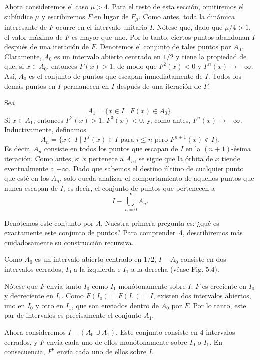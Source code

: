 \documentclass[10pt,a4paper]{book}
\begin{document}
\medskip

Ahora consideremos el caso $\mu>4$. Para el resto de esta sección, omitiremos el subíndice $\mu$ y escribiremos $F$ en lugar de $F_{\mu}$. Como antes, toda la dinámica interesante de $F$ ocurre en el intervalo unitario $I$. Nótese que, dado que $\mu/4>1$, el valor máximo de $F$ es mayor que uno. Por lo tanto, ciertos puntos abandonan $I$ después de una iteración de $F$. Denotemos el conjunto de tales puntos por $A_{0}$. Claramente, $A_{0}$ es un intervalo abierto centrado en $1/2$ y tiene la propiedad de que, si $x\in A_{0}$, entonces $F(x)>1$, de modo que $F^{2}(x)<0$ y $F^{n}(x)\to -\infty$. Así, $A_{0}$ es el conjunto de puntos que escapan inmediatamente de $I$. Todos los demás puntos en $I$ permanecen en $I$ después de una iteración de $F$.

\medskip

Sea
\[
A_{1} = \{x \in I \mid F(x)\in A_{0}\}.
\]
Si $x\in A_{1}$, entonces $F^{2}(x)>1$, $F^{3}(x)<0$, y, como antes, $F^{n}(x)\to -\infty$. Inductivamente, definamos
\[
A_{n}=\{x\in I \mid F^{i}(x)\in I \text{ para } i\leq n \text{ pero } F^{n+1}(x)\notin I\}.
\]
Es decir, $A_{n}$ consiste en todos los puntos que escapan de $I$ en la $(n+1)$-ésima iteración. Como antes, si $x$ pertenece a $A_{n}$, se sigue que la órbita de $x$ tiende eventualmente a $-\infty$. Dado que sabemos el destino último de cualquier punto que esté en los $A_{n}$, solo queda analizar el comportamiento de aquellos puntos que nunca escapan de $I$, es decir, el conjunto de puntos que pertenecen a
\[
I - \bigcup_{n=0}^{\infty} A_{n}.
\]

Denotemos este conjunto por $\Lambda$. Nuestra primera pregunta es: ¿qué es exactamente este conjunto de puntos? Para comprender $\Lambda$, describiremos más cuidadosamente su construcción recursiva.

\newpage

Como $A_{0}$ es un intervalo abierto centrado en $1/2$, $I-A_{0}$ consiste en dos intervalos cerrados, 
$I_{0}$ a la izquierda e $I_{1}$ a la derecha (véase Fig. 5.4).  

Nótese que $F$ envía tanto $I_{0}$ como $I_{1}$ monótonamente sobre $I$; 
$F$ es creciente en $I_{0}$ y decreciente en $I_{1}$.  
Como $F(I_{0})=F(I_{1})=I$, existen dos intervalos abiertos, uno en $I_{0}$ y otro en $I_{1}$, 
que son enviados dentro de $A_{0}$ por $F$.  
Por lo tanto, este par de intervalos es precisamente el conjunto $A_{1}$.

\medskip

Ahora consideremos $I-(A_{0}\cup A_{1})$.  
Este conjunto consiste en $4$ intervalos cerrados, y $F$ envía cada uno de ellos monótonamente sobre 
$I_{0}$ o $I_{1}$.  
En consecuencia, $F^{2}$ envía cada uno de ellos sobre $I$.  
\end{document}
